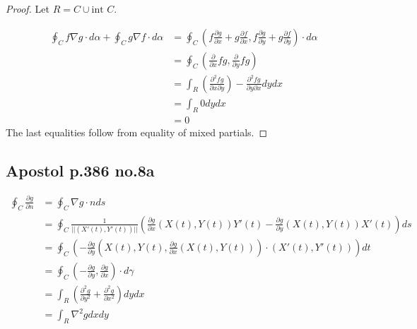 \documentclass[12pt,letterpaper]{article}
\theoremstyle{definition}
\begin{document}
\begin{proof}
  Let $R = C \cup \text{int } C$.

  \begin{align*}
    \oint_Cf \nabla g \cdot d\alpha + \oint_Cg\nabla f\cdot d\alpha &= \oint_C \left(  f\frac{\partial g}{\partial x} + g\frac{\partial f}{\partial x}, f\frac{\partial g}{\partial y} + g\frac{\partial f}{\partial y}\right)\cdot d\alpha \\
                                                                    &= \oint_C \left( \frac{\partial}{\partial x} fg, \frac{\partial }{\partial y}fg \right) \\
                                                                    &= \int_R (\frac{\partial^2 fg}{\partial x \partial y}) - \frac{\partial^2 fg}{\partial y \partial x}dydx \\
                                                                    &= \int_R 0 dydx \\
                                                                    &= 0
  \end{align*}
  The last equalities follow from equality of mixed partials.
\end{proof}

\subsection*{Apostol p.386 no.8a}

\begin{align*}
  \oint_C \frac{\partial g}{\partial n} &= \oint_C \nabla g \cdot n ds\\
                                                 &= \oint_C \frac{1}{||(X'(t), Y'(t))||}\left( \frac{\partial g}{\partial x}(X(t),Y(t))Y'(t) - \frac{\partial g}{\partial y}(X(t),Y(t))X'(t) \right)ds \\
                                        &= \oint_C \left( -\frac{\partial g}{\partial y}(X(t),Y(t),  \frac{\partial g}{\partial x}(X(t),Y(t))) \cdot (X'(t), Y'(t))\right)dt \\
                                                 &= \oint_C (-\frac{\partial g}{\partial y}, \frac{\partial g}{\partial x})\cdot d\gamma \\
                                                 &= \int_R \left(\frac{\partial^2g}{\partial y^2} + \frac{\partial^2g}{\partial x^2}\right)dydx\\
                                                 &= \int_R \nabla^2gdxdy
\end{align*}
\end{document}
